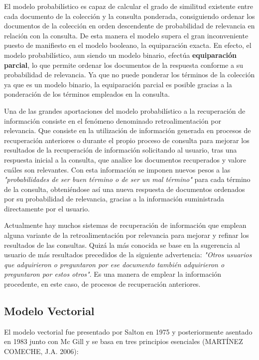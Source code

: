 \documentclass{article}
\begin{document}
El modelo probabilístico es capaz de calcular el grado de similitud existente entre cada documento de la colección y la consulta ponderada, consiguiendo ordenar los documentos de la colección en orden descendente de probabilidad de relevancia en relación con la consulta. De esta manera el modelo supera el gran inconveniente puesto de manifiesto en el modelo booleano, la equiparación exacta. En efecto, el modelo probabilístico, aun siendo un modelo binario, efectúa \textbf{equiparación parcial}, lo que permite ordenar los documentos de la respuesta conforme a su probabilidad de relevancia. Ya que no puede ponderar los términos de la colección ya que es un modelo binario, la equiparación parcial es posible gracias a la ponderación de los términos empleados en la consulta.

Una de las grandes aportaciones del modelo probabilístico a la recuperación de información consiste en el fenómeno denominado retroalimentación por relevancia. Que consiste en la utilización de información generada en procesos de recuperación anteriores o durante el propio proceso de consulta para mejorar los resultados de la recuperación de información solicitando al usuario, tras una respuesta inicial a la consulta, que analice los documentos recuperados y valore cuáles son relevantes. Con esta información se imponen nuevos pesos a las \textit{"probabilidades de ser buen término o de ser un mal término"} para cada término de la consulta, obteniéndose así una nueva respuesta de documentos ordenados por su probabilidad de relevancia, gracias a la información suministrada directamente por el usuario.

Actualmente hay muchos sistemas de recuperación de información que emplean alguna variante de la retroalimentación por relevancia para mejorar y refinar los resultados de las consultas. Quizá la más conocida se base en la sugerencia al usuario de más resultados precedidos de la siguiente advertencia: \textit{"Otros usuarios que adquirieron o preguntaron por ese documento también adquirieron o preguntaron por estos otros"}. Es una manera de emplear la información procedente, en este caso, de procesos de recuperación anteriores.

\subsection{Modelo Vectorial}

El modelo vectorial fue presentado por Salton en 1975 y posteriormente asentado en 1983 junto con Mc Gill y se basa en tres principios esenciales (MARTÍNEZ COMECHE, J.A. 2006):
\end{document}
